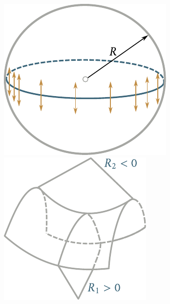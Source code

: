 \begin{figure}[!htb]
	\begin{minipage}[t]{0.5\linewidth}
		\begin{center}
			\includegraphics[scale=1]{figures/ch_14/fig_14_4.pdf}
			\caption[]{}
			\label{fig:14_4}
		\end{center}
	\end{minipage}
	\hspace{-0.05cm}
	\begin{minipage}[t]{0.5\linewidth}
		\begin{center}
			\includegraphics[scale=1]{figures/ch_14/fig_14_5.pdf}
			\caption[]{}
			\label{fig:14_5}
		\end{center}
	\end{minipage}
	\vspace{-0.4cm}
\end{figure}


